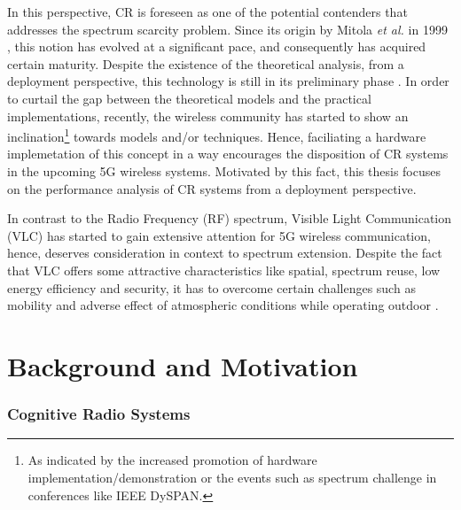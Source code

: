 In this perspective, CR is foreseen as one of the potential contenders that addresses the spectrum scarcity problem. Since its origin by Mitola \textit{et al.} in 1999 \cite{Mitola99}, this notion has evolved at a significant pace, and consequently has acquired certain maturity. Despite the existence of the theoretical analysis, from a deployment perspective, this technology is still in its preliminary phase \cite{Pawe11}. In order to curtail the gap between the theoretical models and the practical implementations, recently, the wireless community has started to show an inclination\footnote{As indicated by the increased promotion of hardware implementation/demonstration or the events such as spectrum challenge in conferences like IEEE DySPAN.} towards models and/or techniques. Hence, faciliating a hardware implemetation of this concept in a way encourages the disposition of CR systems in the upcoming 5G wireless systems. Motivated by this fact, this thesis focuses on the performance analysis of CR systems from a deployment perspective. 

In contrast to the Radio Frequency (RF) spectrum, Visible Light Communication (VLC)  has started to gain extensive attention for 5G wireless communication, hence, deserves consideration in context to spectrum extension. Despite the fact that VLC offers some attractive characteristics like spatial, spectrum reuse, low energy efficiency and security, it has to overcome certain challenges such as mobility and adverse effect of atmospheric conditions while operating outdoor \cite{Wu14}. 


\section{Background and Motivation}
\label{sec:mot}

\subsubsection*{Cognitive Radio Systems }


